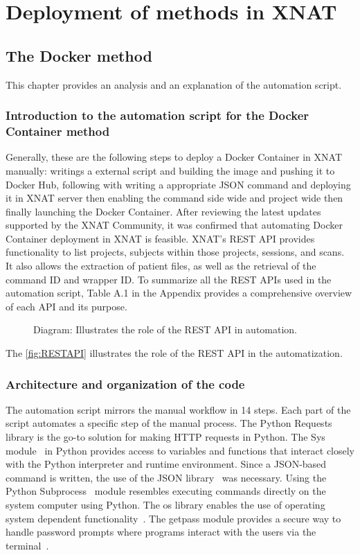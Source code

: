 \chapter{Deployment of methods in XNAT}
\section{The Docker method}
This chapter provides an analysis and an explanation of the automation script.

\subsection{Introduction to the automation script for the Docker Container method}
Generally, these are the following steps to deploy a Docker Container in XNAT manually: writings a external script and building the image and pushing it to Docker Hub, following with writing a appropriate JSON command and deploying it in XNAT server then enabling the command side wide and project wide then finally launching the Docker Container. 
After reviewing the latest updates supported by the XNAT Community, it was confirmed that automating Docker Container deployment in XNAT is feasible.
XNAT's REST API provides functionality to list projects, subjects within those projects, sessions, and scans. It also allows the extraction of patient files, as well as the retrieval of the command \ac{ID} and wrapper \ac{ID}.
To summarize all the REST APIs used in the automation script, Table A.1 in the Appendix provides a comprehensive overview of each API and its purpose.

\begin{figure}[H]
    \centering
    \def\svgwidth{0.4\linewidth}
    
    \caption{ Diagram: Illustrates the role of the REST API in automation.}
    \label{fig:RESTAPI}
\end{figure}


The \autoref{fig:RESTAPI} illustrates the role of the REST API in the automatization.



\subsection{Architecture and organization of the code}
The automation script mirrors the manual workflow in 14 steps. Each part of the script automates a specific step of the manual process.  
The Python Requests~\cite{request} library is the go-to solution for making \ac{HTTP} requests in Python. The Sys module~\cite{sys} in Python provides access to variables and functions that interact closely with the Python interpreter and runtime environment.
Since a JSON-based command is written, the use of the JSON library~\cite{pythonjson} was necessary. Using the Python Subprocess~\cite{subprocess} module resembles executing commands directly on the system computer using Python. The os library enables the use of operating system dependent functionality~\cite{os}.   
The getpass module provides a secure way to handle password prompts where programs interact with the users via the terminal~\cite{getpass}. 

